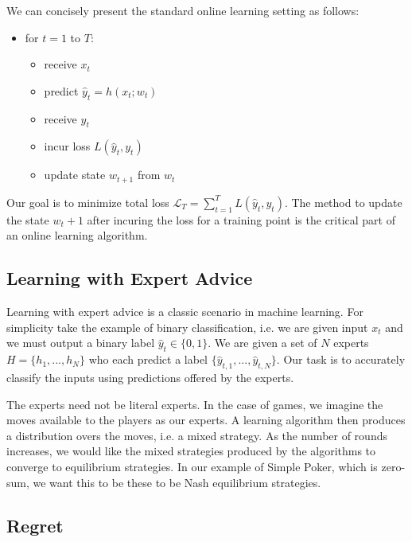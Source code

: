 \documentclass{article}
\begin{document}
We can concisely present the standard online learning setting as follows:

\begin{itemize}
\item for $t = 1$ to $T$:
    \begin{itemize}
    \item receive $x_t$
    \item predict $\hat{y}_t = h(x_t; w_t)$
    \item receive $y_t$
    \item incur loss $L(\hat{y}_t, y_t)$
    \item update state $w_{t+1}$ from $w_t$
    \end{itemize}
\end{itemize}

Our goal is to minimize total loss $\mathcal{L}_T = \sum_{t=1}^T L(\hat{y}_t,y_t)$. The method to update the state $w_t+1$ after incuring the loss for a training point is the critical part of an online learning algorithm. 

\subsection{Learning with Expert Advice}

Learning with expert advice is a classic scenario in machine learning. For simplicity take the example of binary classification, i.e. we are given input ${x_t}$ and we must output a binary label $\hat{y}_t \in \lbrace 0,1 \rbrace$. We are given a set of $N$ experts $H = \lbrace h_1,...,h_N \rbrace $ who each predict a label $\lbrace \hat y_{t,1},...,\hat y_{t,N} \rbrace$. Our task is to accurately classify the inputs using predictions offered by the experts.

The experts need not be literal experts. In the case of games, we imagine the moves available to the players as our experts. A learning algorithm then produces a distribution overs the moves, i.e. a mixed strategy. As the number of rounds increases, we would like the mixed strategies produced by the algorithms to converge to equilibrium strategies. In our example of Simple Poker, which is zero-sum, we want this to be these to be Nash equilibrium strategies.

\subsection{Regret}
\end{document}
